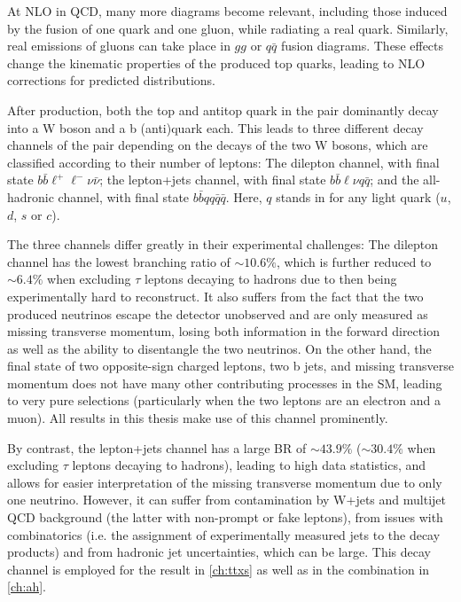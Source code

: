 At NLO in QCD, many more diagrams become relevant, including those induced by the fusion of one quark and one gluon, while radiating a real quark. Similarly, real emissions of gluons can take place in $gg$ or $q\bar{q}$ fusion diagrams. These effects change the kinematic properties of the produced top quarks, leading to NLO corrections for predicted distributions.

After production, both the top and antitop quark in the \ttbar pair dominantly decay into a W boson and a b (anti)quark each. This leads to three different decay channels of the \ttbar pair depending on the decays of the two W bosons, which are classified according to their number of leptons: The dilepton channel, with final state $b \bar{b} \ell^+ \ell^- \nu \bar{\nu}$; the lepton+jets channel, with final state $b \bar{b} \ell \nu q \bar{q}$; and the all-hadronic channel, with final state $b \bar{b} q q \bar{q} \bar{q}$. Here, $q$ stands in for any light quark ($u$, $d$, $s$ or $c$).

The three channels differ greatly in their experimental challenges: The dilepton channel has the lowest branching ratio of $\sim10.6\%$, which is further reduced to $\sim6.4\%$ when excluding $\tau$ leptons decaying to hadrons due to then being experimentally hard to reconstruct. It also suffers from the fact that the two produced neutrinos escape the detector unobserved and are only measured as missing transverse momentum, losing both information in the forward direction as well as the ability to disentangle the two neutrinos. On the other hand, the final state of two opposite-sign charged leptons, two b jets, and missing transverse momentum does not have many other contributing processes in the SM, leading to very pure selections (particularly when the two leptons are an electron and a muon). All results in this thesis make use of this channel prominently.

By contrast, the lepton+jets channel has a large BR of $\sim43.9\%$ ($\sim30.4\%$ when excluding $\tau$ leptons decaying to hadrons), leading to high data statistics, and allows for easier interpretation of the missing transverse momentum due to only one neutrino. However, it can suffer from contamination by W+jets and multijet QCD background (the latter with non-prompt or fake leptons), from issues with combinatorics (i.e. the assignment of experimentally measured jets to the decay products) and from hadronic jet uncertainties, which can be large. This decay channel is employed for the result in \cref{ch:ttxs} as well as in the combination in \cref{ch:ah}.

